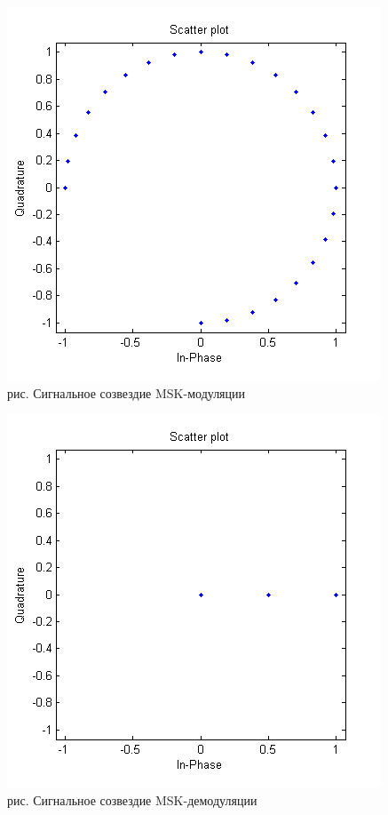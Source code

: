 \documentclass[10pt,a4paper]{report}
\begin{document}
\begin{figure}
\begin{center}
\includegraphics[angle=0, scale = 0.8]{9_9}\newline
рис.  Сигнальное созвездие MSK-модуляции\newline
\end{center}
\end{figure}
\begin{figure}
\begin{center}
\includegraphics[angle=0, scale = 0.8]{9_10}\newline
рис. Сигнальное созвездие MSK-демодуляции\newline
\end{center}
\end{figure}
\end{document}
